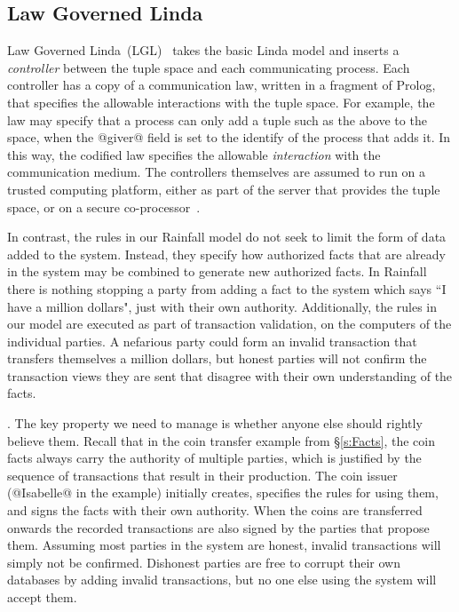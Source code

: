  \cite{Merrick2000:Scopes}

\subsection{Law Governed Linda}
Law Governed Linda~(LGL)~\cite{Minsky1994:LawGovernedLinda, Minsky2001:SafeTupleSpace} takes the basic Linda model and inserts a \emph{controller} between the tuple space and each communicating process. Each controller has a copy of a communication law, written in a fragment of Prolog, that specifies the allowable interactions with the tuple space. For example, the law may specify that a process can only add a tuple such as the above to the space, when the @giver@ field is set to the identify of the process that adds it. In this way, the codified law specifies the allowable \emph{interaction} with the communication medium. The controllers themselves are assumed to run on a trusted computing platform, either as part of the server that provides the tuple space, or on a secure co-processor~\cite{Minsky2001:SafeTupleSpace}.

In contrast, the rules in our Rainfall model do not seek to limit the form of data added to the system. Instead, they specify how authorized facts that are already in the system may be combined to generate new authorized facts. In Rainfall there is nothing stopping a party from adding a fact to the system which says ``I have a million dollars", just with their own authority. Additionally, the rules in our model are executed as part of transaction validation, on the computers of the individual parties. A nefarious party could form an invalid transaction that transfers themselves a million dollars, but honest parties will not confirm the transaction views they are sent that disagree with their own understanding of the facts.

. The key property we need to manage is whether anyone else should rightly believe them. Recall that in the coin transfer example from \S\ref{s:Facts}, the coin facts always carry the authority of multiple parties, which is justified by the sequence of transactions that result in their production. The coin issuer (@Isabelle@ in the example) initially creates, specifies the rules for using them, and signs the facts with their own authority. When the coins are transferred onwards the recorded transactions are also signed by the parties that propose them. Assuming most parties in the system are honest, invalid transactions will simply not be confirmed. Dishonest parties are free to corrupt their own databases by adding invalid transactions, but no one else using the system will accept them.


